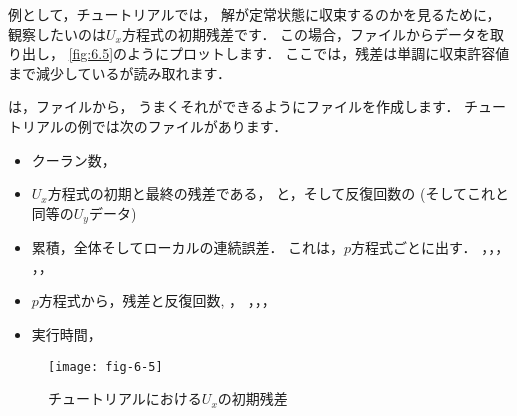 例として，チュートリアルでは，
解が定常状態に収束するのかを見るために，
観察したいのは$U_{x}$方程式の初期残差です．
この場合，ファイルからデータを取り出し，
\autoref{fig:6.5}のようにプロットします．
ここでは，残差は単調に収束許容値まで減少しているが読み取れます．

は，ファイルから，
うまくそれができるようにファイルを作成します．
チュートリアルの例では次のファイルがあります．
\begin{itemize}
 \item クーラン数，
 \item $U_{x}$方程式の初期と最終の残差である，
       と，そして反復回数の
        (そしてこれと同等の$U_{y}$データ)
 \item 累積，全体そしてローカルの連続誤差．
       これは，$p$方程式ごとに出す．
       ，，，
       ，，
 \item $p$方程式から，残差と反復回数, ，
       ，，，
 \item 実行時間，
\end{itemize}


\begin{figure}[ht]
 \texttt{[image: fig-6-5]}
 \caption{チュートリアルにおける$U_{x}$の初期残差}
 \label{fig:6.5}
\end{figure}
